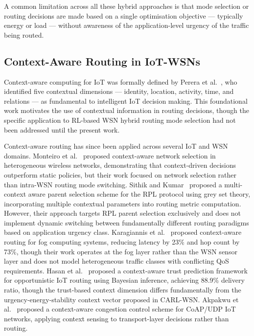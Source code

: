 \documentclass[12pt]{article}
\begin{document}
A common limitation across all these hybrid approaches is that mode
selection or routing decisions are made based on a single optimisation
objective --- typically energy or load --- without awareness of the
application-level urgency of the traffic being routed.

\subsection{Context-Aware Routing in IoT-WSNs}

Context-aware computing for IoT was formally defined by Perera
et al.~\cite{perera_context_2014}, who identified five contextual
dimensions --- identity, location, activity, time, and relations ---
as fundamental to intelligent IoT decision making. This foundational
work motivates the use of contextual information in routing decisions,
though the specific application to RL-based WSN hybrid routing mode
selection had not been addressed until the present work.

Context-aware routing has since been applied across several IoT and
WSN domains. Monteiro et al.~\cite{monteiro_context-aware_2019}
proposed context-aware network selection in heterogeneous wireless
networks, demonstrating that context-driven decisions outperform
static policies, but their work focused on network selection rather
than intra-WSN routing mode switching. Sithik and
Kumar~\cite{sithik_intelligent_2022} proposed a multi-context aware
parent selection scheme for the RPL protocol using grey set theory,
incorporating multiple contextual parameters into routing metric
computation. However, their approach targets RPL parent selection
exclusively and does not implement dynamic switching between
fundamentally different routing paradigms based on application urgency
class. Karagiannis et al.~\cite{karagiannis_context-aware_2023}
proposed context-aware routing for fog computing systems, reducing
latency by 23\% and hop count by 73\%, though their work operates at
the fog layer rather than the WSN sensor layer and does not model
heterogeneous traffic classes with conflicting QoS requirements. Hasan
et al.~\cite{hasan_context-aware_2025} proposed a context-aware trust
prediction framework for opportunistic IoT routing using Bayesian
inference, achieving 88.9\% delivery ratio, though the trust-based
context dimension differs fundamentally from the urgency-energy-stability
context vector proposed in CARL-WSN. Akpakwu et al.~\cite{akpakwu_cacc_2020} proposed a context-aware
congestion control scheme for CoAP/UDP IoT networks, applying context
sensing to transport-layer decisions rather than routing.
\end{document}
